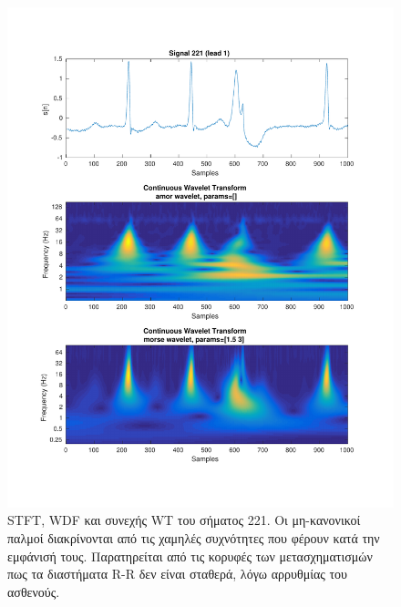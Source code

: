 \documentclass[11pt,a4paper]{article}
\begin{document}
\begin{figure}[H]
\begin{minipage}{0.48\textwidth}
	\includegraphics[width=\textwidth]{fig/221l1_cwt.pdf}
\end{minipage}
\vfill
\caption{STFT, WDF και συνεχής WT του σήματος 221. Οι μη-κανονικοί παλμοί διακρίνονται από τις χαμηλές συχνότητες που φέρουν κατά την εμφάνισή τους. Παρατηρείται από τις κορυφές των μετασχηματισμών πως τα διαστήματα R-R δεν είναι σταθερά, λόγω αρρυθμίας του ασθενούς.}
\label{fig:221l1_stft_wdf_wt}
\end{figure}
\end{document}
